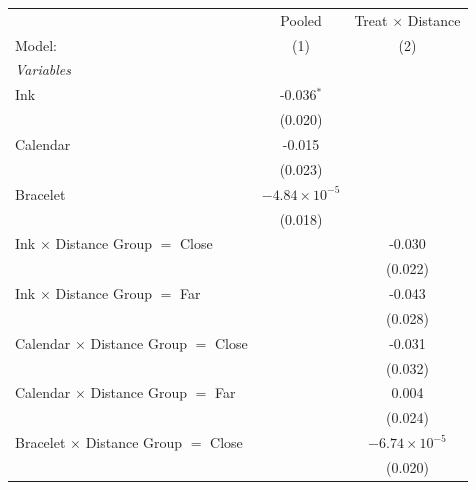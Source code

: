 
 
\caption{\label{tab:monitoring-attrition-treatment} Differential Monitoring Attrition by Treatment Assignment}
\centering
\begin{tabular}{lcc}
   \tabularnewline \midrule \midrule
                                               & Pooled                 & Treat $\times$ Distance \\    
   Model:                                      & (1)                    & (2)\\  
   \midrule
   \emph{Variables}\\
   Ink                                         & -0.036$^{*}$           &   \\   
                                               & (0.020)                &   \\   
   Calendar                                    & -0.015                 &   \\   
                                               & (0.023)                &   \\   
   Bracelet                                    & $-4.84\times 10^{-5}$  &   \\   
                                               & (0.018)                &   \\   
   Ink $\times$ Distance Group $=$ Close       &                        & -0.030\\   
                                               &                        & (0.022)\\   
   Ink $\times$ Distance Group $=$ Far         &                        & -0.043\\   
                                               &                        & (0.028)\\   
   Calendar $\times$ Distance Group $=$ Close  &                        & -0.031\\   
                                               &                        & (0.032)\\   
   Calendar $\times$ Distance Group $=$ Far    &                        & 0.004\\   
                                               &                        & (0.024)\\   
   Bracelet $\times$ Distance Group $=$ Close  &                        & $-6.74\times 10^{-5}$\\    
                                               &                        & (0.020)\\   

\end{tabular}
